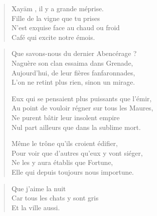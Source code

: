 %
\begin{verse}\quatrain
  Xayām%
  ,\label{foot.xayam} il y a grande méprise.\\  %
  Fille de la vigne que tu prises\\ 
  N’est exquise face au chaud ou froid\\ 
  Café qui excite notre émois.  %
\end{verse}

\begin{verse}\quatrain
  Que savons-nous du dernier Abencérage%
\label{foot.Abencerage} ?\\  %
  Naguère son clan essaima dans Grenade,\\ 
  Aujourd’hui, de leur fières fanfaronnades,\\ 
  L’on ne retint plus rien, sinon un mirage.  %

  Eux qui se pensaient plus puissants que l’émir,\\ 
  Au point de vouloir régner sur tous les Maures,\\ 
  Ne purent bâtir leur insolent empire\\ 
  Nul part ailleurs que dans la sublime mort.  %

  Même le trône qu’ils croient édifier,\\ 
  Pour voir que d’autres qu’eux y vont siéger,\\ 
  Ne les y aura établis que Fortune,\\ 
  Elle qui depuis toujours nous importune.  %
\end{verse}

\begin{verse}\haiku
  Que j’aime la nuit\\  %
  Car tous les chats y sont gris\\  %
  Et la ville aussi.
\end{verse}

